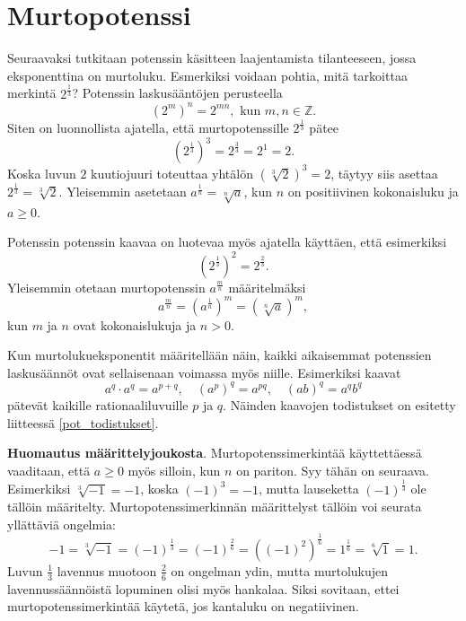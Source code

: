 \chapter{Murtopotenssi}

Seuraavaksi tutkitaan potenssin käsitteen laajentamista tilanteeseen, jossa eksponenttina on murtoluku.
Esmerkiksi voidaan pohtia, mitä tarkoittaa merkintä $2^\frac{1}{3}$? Potenssin laskusääntöjen perusteella
\[
(2^{m})^n = 2^{mn},\textrm{ kun }m,n\in \mathbb{Z}.
\]
Siten on luonnollista ajatella, että murtopotenssille $2^\frac{1}{3}$ pätee
\[
(2^\frac{1}{3})^3 = 2^\frac{3}{3} = 2^1=2.
\]
Koska luvun $2$ kuutiojuuri toteuttaa yhtälön $(\sqrt[3]{2})^3=2$, täytyy siis asettaa $2^\frac{1}{3}=\sqrt[3]{2}$. Yleisemmin asetetaan $a^\frac{1}{n} =\sqrt[n]{a}$, kun $n$ on positiivinen kokonaisluku ja $a\ge 0$.

Potenssin potenssin kaavaa on luotevaa myös ajatella käyttäen, että esimerkiksi
\[
(2^{\frac{1}{3}})^2 = 2^{\frac{2}{3}}.
\]
Yleisemmin otetaan murtopotenssin $a^\frac{m}{n}$ määritelmäksi
\[
a^\frac{m}{n} = (a^{\frac{1}{n}})^m = (\sqrt[n]{a})^m,
\]
kun $m$ ja $n$ ovat kokonaislukuja ja $n>0$. 



Kun murtolukueksponentit määritellään näin, kaikki aikaisemmat potenssien
laskusäännöt ovat sellaisenaan voimassa myös niille. Esimerkiksi kaavat
\[ a^q\cdot a^q = a^{p+q}, \quad (a^p)^q = a^{pq}, \quad (ab)^q=a^qb^q \]
pätevät kaikille rationaaliluvuille $p$ ja $q$.  Näinden kaavojen todistukset on esitetty liitteessä \ref{pot_todistukset}.

{\bf Huomautus määrittelyjoukosta}. Murtopotenssimerkintää käyttettäessä vaaditaan, että $a\geq 0$ myös silloin, kun $n$ on pariton. Syy tähän on seuraava. Esimerkiksi $\sqrt[3]{-1}=-1$, koska $(-1)^3=-1$, mutta lauseketta $(-1)^\frac{1}{3}$ ole tällöin määritelty. Murtopotenssimerkinnän määrittelyst tällöin voi seurata yllättäviä ongelmia:
\[
 -1 = \sqrt[3]{-1} = (-1)^\frac{1}{3} = (-1)^\frac{2}{6}
= ((-1)^2)^\frac{1}{6} = 1^\frac{1}{6} = \sqrt[6]{1} = 1. 
\]
Luvun $\frac{1}{3}$ lavennus muotoon $\frac{2}{6}$ on ongelman ydin, mutta murtolukujen lavennussäännöistä lopuminen olisi myös hankalaa. Siksi sovitaan, ettei murtopotenssimerkintää käytetä, jos kantaluku on negatiivinen.

